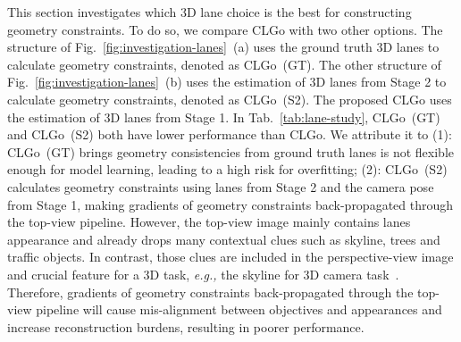 \documentclass[letterpaper]{article} \usepackage{aaai22}  \usepackage{times}  \usepackage{helvet}  \usepackage{courier}  \usepackage[hyphens]{url}  \usepackage{graphicx} \urlstyle{rm} \def\UrlFont{\rm}  \usepackage{natbib}  \usepackage{caption}
\begin{document}
This section investigates which 3D lane choice is the best for constructing geometry constraints. To do so, we compare CLGo with two other options. The structure of Fig.~\ref{fig:investigation-lanes}~(a) uses the ground truth 3D lanes to calculate geometry constraints, denoted as CLGo~(GT). The other structure of Fig.~\ref{fig:investigation-lanes}~(b) uses the estimation of 3D lanes from Stage 2 to calculate geometry constraints, denoted as CLGo~(S2). The proposed CLGo uses the estimation of 3D lanes from Stage 1.
In Tab.~\ref{tab:lane-study}, CLGo~(GT) and CLGo~(S2) both have lower performance than CLGo. 
We attribute it to (1): CLGo~(GT) brings geometry consistencies from ground truth lanes is not flexible enough for model learning, leading to a high risk for overfitting; (2): CLGo~(S2) calculates geometry constraints using lanes from Stage 2 and the camera pose from Stage 1, making gradients of geometry constraints back-propagated through the top-view pipeline. However, the top-view image mainly contains lanes appearance and already drops many contextual clues such as skyline, trees and traffic objects. In contrast, those clues are included in the perspective-view image and crucial feature for a 3D task, \emph{e.g.,} the skyline for 3D camera task~\cite{MonoEF}. Therefore, gradients of geometry constraints back-propagated through the top-view pipeline will cause mis-alignment between objectives and appearances and increase reconstruction burdens, resulting in poorer performance.



\begin{table}[t]
\begin{center}
\caption{Quantitative results of different two-stage architectures on SVV~(\%). The Error means total lane fitting error given in meters.}
\label{tab:stage-study}
\end{center}
\vspace{-0.05em}
\end{table}
\end{document}

